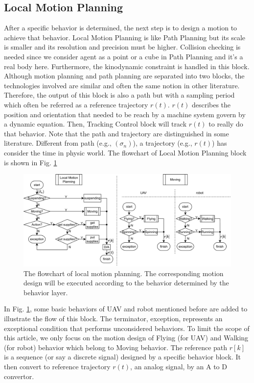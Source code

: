 \documentclass{ieeeaccess}
\begin{document}
\subsection{Local Motion Planning}
After a specific behavior is determined, the next step is to design a motion to achieve that behavior. Local Motion Planning is like Path Planning but its scale is smaller and its resolution and precision must be higher. Collision checking is needed since we consider agent as a point or a cube in Path Planning and it's a real body here. Furthermore, the kinodynamic constraint is handled in this block. Although motion planning and path planning are separated into two blocks, the technologies involved are similar and often the same notion in other literature. Therefore, the output of this block is also a path but with a sampling period which often be referred as a reference trajectory $r(t)$. $r(t)$ describes the position and orientation that needed to be reach by a machine system govern by a dynamic equation. Then, Tracking Control block will track $r(t)$ to really do that behavior. Note that the path and trajectory are distinguished in some literature. Different from path (e.g., $(\sigma_n)$), a trajectory (e.g., $r(t)$) has consider the time in physic world. The flowchart of Local Motion Planning block is shown in Fig. \ref{fig:LocalMotionPlanning}

\begin{figure}[htbp]
    \centering
    \includegraphics[scale=.4]{fig/LMP.pdf}\caption{The flowchart of local motion planning. The corresponding motion design will be executed according to the behavior determined by the behavior layer.}
    \label{fig:LocalMotionPlanning}
\end{figure}

In Fig. \ref{fig:LocalMotionPlanning}, some basic behaviors of UAV and robot mentioned before are added to illustrate the flow of this block. The terminator, exception, represents an exceptional condition that performs unconsidered behaviors. To limit the scope of this article, we only focus on the motion design of Flying (for UAV) and Walking (for robot) behavior which belong to Moving behavior. The reference path $r[k]$ is a sequence (or say a discrete signal) designed by a specific behavior block. It then convert to reference trajectory $r(t)$, an analog signal, by an A to D convertor.
\end{document}
